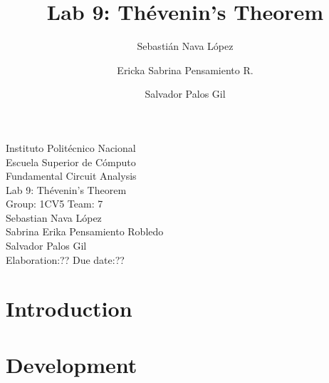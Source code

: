 \documentclass[letterpaper]{article}
\title{Lab 9: Thévenin's Theorem}
\author{
    Sebastián Nava López\\
    \and
    Ericka Sabrina Pensamiento R.\\
    \and
    Salvador Palos Gil
}
\begin{document}
\begin{titlepage}
    \centering
    {\Huge Instituto Politécnico Nacional}\\[3ex]
    {\huge Escuela Superior de Cómputo}\\[8ex]
    {\huge Fundamental Circuit Analysis}\\[12ex]
    {\Large Lab 9: Thévenin's Theorem}\\[20ex]
    {\Large Group: 1CV5 Team: 7 \\[8ex]
    Sebastian Nava López\\[4ex]
    Sabrina Erika Pensamiento Robledo\\[4ex]
    Salvador Palos Gil\\[18ex]
    }
    \large{Elaboration:?? \hspace{8em} Due date:??}
\end{titlepage}
\tableofcontents
\newpage
\section{Introduction}
\newpage
\section{Development}
\end{document}
